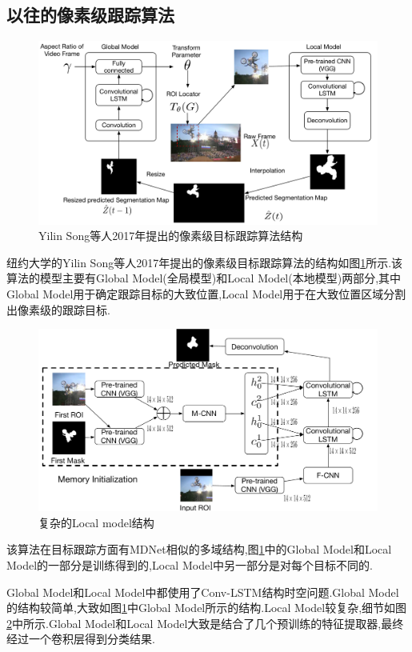 \subsection{以往的像素级跟踪算法}
\begin{figure}[htbp!]
    \centering
    \includegraphics[width = 1.\textwidth]{chap/img/Tracking_framework.pdf}
    \caption{Yilin Song等人2017年提出的像素级目标跟踪算法结构\supercite{DBLP:journals/corr/abs-1711-07377}}
    \label{fig:pixel_level_vot_2017}
\end{figure}
\par
纽约大学的Yilin Song等人2017年提出的像素级目标跟踪算法的结构如图\ref{fig:pixel_level_vot_2017}所示.该算法的模型主要有Global Model(全局模型)和Local Model(本地模型)两部分,其中Global Model用于确定跟踪目标的大致位置,Local Model用于在大致位置区域分割出像素级的跟踪目标.
\par
\begin{figure}[htbp!]
    \centering
    \includegraphics[width = 1.\textwidth]{chap/img/Local.pdf}
    \caption{复杂的Local model结构\supercite{DBLP:journals/corr/abs-1711-07377}}
    \label{fig:local_model}
\end{figure}
\par
该算法在目标跟踪方面有MDNet相似的多域结构,图\ref{fig:pixel_level_vot_2017}中的Global Model和Local Model的一部分是训练得到的,Local Model中另一部分是对每个目标不同的.
\par
Global Model和Local Model中都使用了Conv-LSTM结构时空问题.Global Model的结构较简单,大致如图\ref{fig:pixel_level_vot_2017}中Global Model所示的结构.Local Model较复杂,细节如图\ref{fig:local_model}中所示.Global Model和Local Model大致是结合了几个预训练的特征提取器,最终经过一个卷积层得到分类结果.


